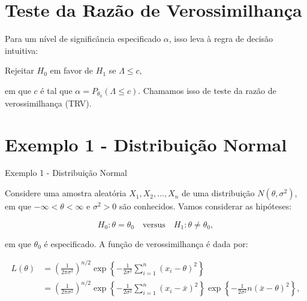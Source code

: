 \documentclass[12pt]{beamer}
\begin{document}
\section{Teste da Razão de Verossimilhança}
\begin{frame}{}
\begin{block}{}
\justifying
Para um nível de significância especificado $\alpha$, isso leva à regra de decisão intuitiva:

\begin{center}
Rejeitar $H_0$ em favor de $H_1$ se $\Lambda \leq c,$
\end{center}

em que $c$ é tal que $\alpha = P_{\theta_0}(\Lambda \leq c)$. Chamamos isso de teste da razão de verossimilhança (TRV).
\end{block}
\end{frame}

\section{Exemplo 1 - Distribuição Normal}
\begin{frame}{Exemplo 1 - Distribuição Normal}
	\begin{block}{}
		\justifying
		Considere uma amostra aleatória $X_1, X_2, \ldots, X_n$ de uma distribuição $N(\theta, \sigma^2)$, em que $-\infty < \theta < \infty$ e $\sigma^2 > 0$ são conhecidos. Vamos considerar as hipóteses:
		
		\[ H_0 : \theta = \theta_0 \quad \text{versus} \quad H_1 : \theta \neq \theta_0, \]
		
		em que $\theta_0$ é especificado. A função de verossimilhança é dada por:
		
		\[
		\begin{aligned}
			L(\theta) &= \left(\frac{1}{2\pi\sigma^2}\right)^{n/2} \exp\left\{ -\frac{1}{2\sigma^2} \sum_{i=1}^{n}(x_i - \theta)^2 \right\} \\
			&= \left(\frac{1}{2\pi\sigma^2}\right)^{n/2} \exp\left\{ -\frac{1}{2\sigma^2} \sum_{i=1}^{n}(x_i - \bar{x})^2 \right\} \exp\left\{ -\frac{1}{2\sigma^2}n(\bar{x} - \theta)^2 \right\},
		\end{aligned}
		\]
	\end{block}
\end{frame}
\end{document}
